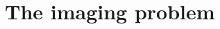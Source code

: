 \documentclass[a4paper,11pt,oneside,notitlepage]{article}
\numberwithin{equation}{section}
\def\R{\mathbb{R}}
\def\N{\mathbb{N}}
\newcommand{\dist}{\mathrm{dist}}
\newcommand{\vphi}{\varphi}
\newcommand{\vrho}{\varrho}
\newcommand{\E}{\mathcal{E}}
\begin{document}


\section{The imaging problem}
\label{sec:imaging}
\end{document}
